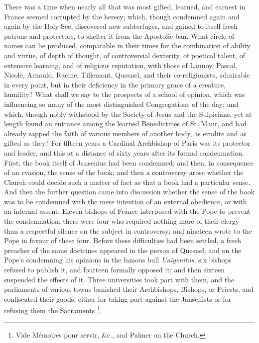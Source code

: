 There was a time when nearly all that was most gifted, learned, and
earnest in France seemed corrupted by the heresy; which, though
condemned again and again by the Holy See, discovered new subterfuges,
and gained to itself fresh patrons and protectors, to shelter it from
the Apostolic ban. What circle of names can be produced, comparable in
their times for the combination of ability and virtue, of depth of
thought, of controversial dexterity, of poetical talent, of extensive
learning, and of religious reputation, with those of Launoy, Pascal,
Nicole, Arnauld, Racine, Tillemont, Quesnel, and their
co-religionists, admirable in every point, but in their deficiency in
the primary grace of a creature, humility? What shall we say to the
prospects of a school of opinion, which was influencing so many of the
most distinguished Congregations of the day; and which, though nobly
withstood by the Society of Jesus and the Sulpicians, yet at length
found an entrance among the learned Benedictines of St. Maur, and had
already sapped the faith of various members of another body, as
erudite and as gifted as they? For fifteen years a Cardinal Archbishop
of Paris was its protector and leader, and this at a distance of sixty
years after its formal condemnation. First, the book itself of
Jansenius had been condemned; and then, in consequence of an evasion,
the sense of the book; and then a controversy arose whether the Church
could decide such a matter of fact as that a book had a particular
sense. And then the further question came into discussion whether the
sense of the book was to be condemned with the mere intention of an
external obedience, or with an internal assent. Eleven bishops of
France interposed with the Pope to prevent the condemnation; there
were four who required nothing more of their clergy than a respectful
silence on the subject in controversy; and nineteen wrote to the Pope
in favour of these four. Before these difficulties had been settled, a
fresh preacher of the same doctrines appeared in the person of Quesnel;
and on the Pope's condemning his opinions in the famous bull \emph{Unigenitus},
six bishops refused to publish it, and fourteen formally opposed it;
and then sixteen suspended the effects of it. Three universities took
part with them, and the parliaments of various towns banished their
Archbishops, Bishops, or Priests, and confiscated their goods, either
for taking part against the Jansenists or for refusing them the
Sacraments \footnote{Vide Mémoires pour servir, \&c., and
Palmer on the Church.}.

